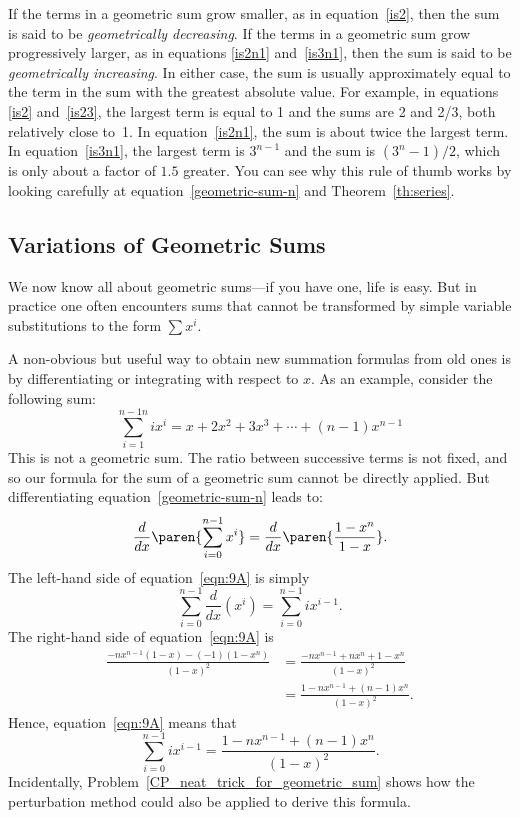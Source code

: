 If the terms in a geometric sum grow smaller, as in
equation~\ref{is2}, then the sum is said to be \emph{geometrically
  decreasing}.  If the terms in a geometric sum grow progressively
larger, as in equations \ref{is2n1} and~\ref{is3n1}, then the sum is
said to be \emph{geometrically increasing}.  In either case, the sum
is usually approximately equal to the term in the sum with the
greatest absolute value.  For example, in equations \ref{is2}
and~\ref{is23}, the largest term is equal to 1 and the sums are 2 and
2/3, both relatively close to~1.  In equation~\ref{is2n1}, the sum is
about twice the largest term.  In equation~\ref{is3n1}, the largest
term is $3^{n-1}$ and the sum is $(3^n-1)/2$, which is only about a
factor of $1.5$ greater.  You can see why this rule of thumb works by
looking carefully at equation~\ref{geometric-sum-n} and
Theorem~\ref{th:series}.

\subsection{Variations of Geometric Sums}\label{variant_sum_sec}

We now know all about geometric sums---if you have one, life is easy.
But in practice one often encounters sums that cannot be transformed
by simple variable substitutions to the form $\sum x^i$.

A non-obvious but useful way to obtain new summation formulas from
old ones is by differentiating or integrating with respect to $x$.  As
an example, consider the following sum:
\[
\sum_{i=1}^{n-1n} i x^i = x + 2 x^2 + 3 x^3 + \cdots + (n - 1) x^{n -
  1}
\]
This is not a geometric sum.  The ratio between successive terms
is not fixed, and so our formula for the sum of a geometric sum cannot
be directly applied.  But differentiating
equation~\ref{geometric-sum-n} leads
to:
\begin{equation}\label{eqn:9A}
\frac{d}{dx} \paren{ \sum_{i = 0}^{n - 1} x^i }
   = \frac{d}{dx} \paren{ \frac{1 - x^n}{1 - x} }.
\end{equation}
The left-hand side of equation~\ref{eqn:9A} is simply
\[
\sum_{i = 0}^{n - 1} \frac{d}{dx} (x^i)
    = \sum_{i = 0}^{n - 1} i x^{i - 1}.
\]
The right-hand side of equation~\ref{eqn:9A} is
\begin{align*}
\frac{ -n x^{n - 1} (1 - x) - (-1) (1 - x^n) }{ (1 - x)^2 }
    &= \frac{ -n x^{n - 1} + n x^n + 1 - x^n }{ (1 - x)^2 } \\
    &= \frac{1 - n x^{n - 1} + (n - 1) x^n}{ (1 - x)^2 }.
\end{align*}
Hence, equation~\ref{eqn:9A} means that
\[
\sum_{i = 0}^{n - 1} i x^{i - 1}
    = \frac{1 - n x^{n - 1} + (n - 1) x^n}{ (1 - x)^2 }.
\]
Incidentally, Problem~\ref{CP_neat_trick_for_geometric_sum} shows how
the perturbation method could also be applied to derive this formula.

